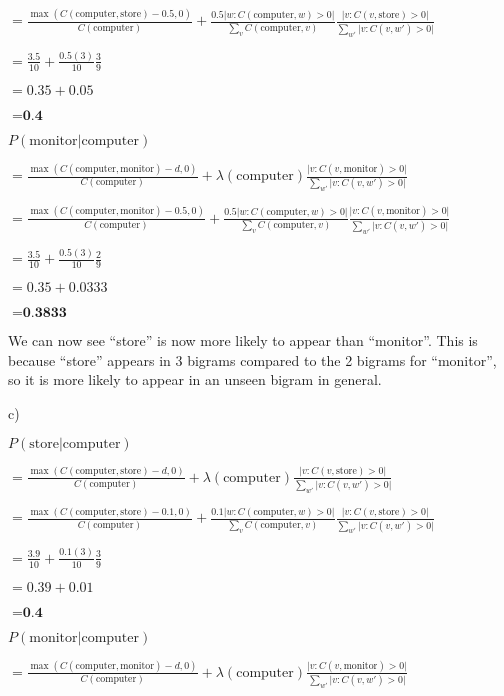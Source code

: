 \begin{solution}
$= \frac{\max(C(\text{computer}, \text{store}) - 0.5, 0)}{C(\text{computer})} + \frac{0.5 \vert w : C(\text{computer},w) > 0 \vert}{\sum_{v}C(\text{computer}, v)}\frac{\vert v : C(v, \text{store}) > 0\vert}{\sum_{w'} \vert v : C(v, w') > 0 \vert}$

$= \frac{3.5}{10} + \frac{0.5(3)}{10}\frac{3}{9}$

$= 0.35 + 0.05$

$= \textbf{0.4}$

$P(\text{monitor} \vert \text{computer}) $

$= \frac{\max(C(\text{computer}, \text{monitor}) - d, 0)}{C(\text{computer})} + \lambda(\text{computer})\frac{\vert v : C(v, \text{monitor}) > 0\vert}{\sum_{w'} \vert v : C(v, w') > 0 \vert}$

$= \frac{\max(C(\text{computer}, \text{monitor}) - 0.5, 0)}{C(\text{computer})} + \frac{0.5 \vert w : C(\text{computer},w) > 0 \vert}{\sum_{v}C(\text{computer}, v)}\frac{\vert v : C(v, \text{monitor}) > 0\vert}{\sum_{w'} \vert v : C(v, w') > 0 \vert}$

$= \frac{3.5}{10} + \frac{0.5(3)}{10}\frac{2}{9}$

$= 0.35 + 0.0333$

$= \textbf{0.3833}$

We can now see ``store'' is now more likely to appear than ``monitor''. This is because ``store'' appears in 3 bigrams compared to the 2 bigrams for ``monitor'', so it is more likely to appear in an unseen bigram in general.

c)

$P(\text{store} \vert \text{computer}) $

$= \frac{\max(C(\text{computer}, \text{store}) - d, 0)}{C(\text{computer})} + \lambda(\text{computer})\frac{\vert v : C(v, \text{store}) > 0\vert}{\sum_{w'} \vert v : C(v, w') > 0 \vert}$

$= \frac{\max(C(\text{computer}, \text{store}) - 0.1, 0)}{C(\text{computer})} + \frac{0.1 \vert w : C(\text{computer},w) > 0 \vert}{\sum_{v}C(\text{computer}, v)}\frac{\vert v : C(v, \text{store}) > 0\vert}{\sum_{w'} \vert v : C(v, w') > 0 \vert}$

$= \frac{3.9}{10} + \frac{0.1(3)}{10}\frac{3}{9}$

$= 0.39 + 0.01$

$= \textbf{0.4}$

$P(\text{monitor} \vert \text{computer}) $

$= \frac{\max(C(\text{computer}, \text{monitor}) - d, 0)}{C(\text{computer})} + \lambda(\text{computer})\frac{\vert v : C(v, \text{monitor}) > 0\vert}{\sum_{w'} \vert v : C(v, w') > 0 \vert}$


\end{solution}
